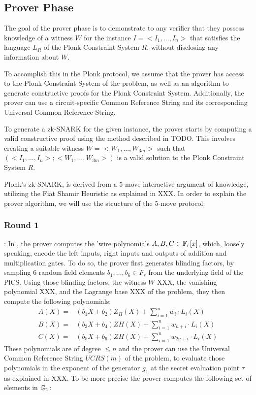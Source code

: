 \subsection{Prover Phase}
The goal of the prover phase is to demonstrate to any verifier that they possess knowledge of a witness $W$ for the instance $I=<I_1,\ldots, I_n>$ that satisfies the language $L_R$ of the Plonk Constraint System $R$, without disclosing any information about $W$.

To accomplish this in the Plonk protocol, we assume that the prover has access to the Plonk Constraint System of the problem, as well as an algorithm to generate constructive proofs for the Plonk Constraint System. Additionally, the prover can use a circuit-specific Common Reference String and its corresponding Universal Common Reference String.

To generate a zk-SNARK for the given instance, the prover starts by computing a valid constructive proof using the method described in TODO. This involves creating a suitable witness $W=<W_{1},\ldots,W_{3m}>$ such that $(<I_1,\ldots, I_n>; <W_{1},\ldots,W_{3m}>)$ is a valid solution to the Plonk Constraint System $R$.

Plonk's zk-SNARK, is derived from a 5-move interactive argument of knowledge, utilizing the Fiat Shamir Heuristic as explained in XXX. In order to explain the prover algorithm, we will use the structure of the 5-move protocol:

\subsubsection{Round 1}: In , the prover computes the 'wire polynomials $A,B,C\in \mathbb{F}_r[x]$, which, loosely speaking, encode the left inputs, right inputs and outputs of addition and multiplication gates. To do so, the prover first generates blinding factors, by sampling $6$ random field elements $b_1, \ldots, b_6 \in F_r$ from the underlying field of the PlCS. Using those blinding factors, the witness $W$ XXX, the vanishing polynomial XXX, and the Lagrange base XXX of the problem, they then compute the following polynomials:
\begin{equation}
\begin{array}{rl}
A(X) =& (b_1X + b_2)Z_H(X) + \sum_{i=1}^n w_i\cdot L_i(X)\\
B(X) =& (b_3X + b_4)ZH(X) + \sum_{i=1}^n w_{n+i}\cdot L_i(X)\\
C(X) =& (b_5X + b_6)ZH(X) + \sum_{i=1}^n w_{2n+i}\cdot L_i(X)
\end{array}
\end{equation}
These polynomials are of degree $\leq n$ and the prover can use the Universal Common Reference String $UCRS(m)$ of the problem, to evaluate those polynomials in the exponent of the generator $g_1$ at the secret evaluation point $\tau$ as explained in XXX. To be more precise the prover computes the following set of elements in $\mathbb{G}_1$: 

